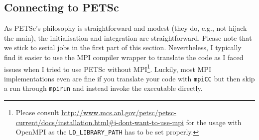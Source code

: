 \subsection{Connecting to PETSc}

As PETSc's philosophy is straightforward and modest (they do, e.g.,
not hijack the main), the initialisation and integration are straightforward.
Please note that we stick to serial jobs in the first part of this
section.
Nevertheless, I typically find it easier to use 
the MPI compiler wrapper to translate the code as I faced
issues when I tried to use PETSc without MPI\footnote{Please consult
\url{http://www.mcs.anl.gov/petsc/petsc-current/docs/installation.html\#i-dont-want-to-use-mpi}
for the usage with OpenMPI as the \texttt{LD\_LIBRARY\_PATH} has to be set
properly.}.
Luckily, most MPI implementations even are fine if you translate your code with
\texttt{mpiCC} but then skip a run through \texttt{mpirun} and instead invoke
the executable directly.


